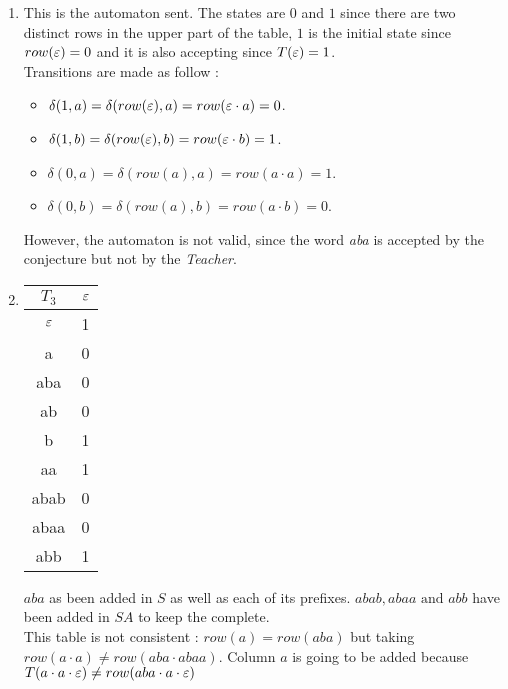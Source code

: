 \begin{enumerate}
  \item \begin{minipage}{0.3\textwidth}
          
        \end{minipage}\quad
        \begin{minipage}{0.6\textwidth}
          This is the automaton sent.
          The states are $0$ and $1$ since there are two distinct rows in the upper part of the table, $1$ is the initial state since $row(\varepsilon) = 0$ and it is also accepting since $T(\varepsilon) = 1$.\\
          Transitions are made as follow : \\
          \begin{itemize}
            \item $\delta(1, a) = \delta(row(\varepsilon), a) = row(\varepsilon \cdot a) = 0$.
            \item $\delta(1, b) = \delta(row(\varepsilon), b) = row(\varepsilon \cdot b) =  1$.
            \item $\delta(0, a) = \delta(row(a), a) = row(a \cdot a) =  1$.
            \item $\delta(0, b) = \delta(row(a), b) = row(a \cdot b) = 0$.
          \end{itemize}
          However, the automaton is not valid, since the word \textit{aba} is accepted by the conjecture but not by the \textit{Teacher}.
        \end{minipage}

  \item \begin{minipage}{0.3\textwidth}
          \begin{tabular}{c||c}
            $T_3$ & $\varepsilon$ \\
            \hline\hline
            $\varepsilon$  & 1    \\
            a     & 0    \\
            aba   & 0    \\
            ab    & 0    \\
            \hline\hline
            b     & 1    \\
            aa    & 1    \\
            abab  & 0    \\
            abaa  & 0    \\
            abb   & 1    \\
          \end{tabular}
        \end{minipage} \quad
        \begin{minipage}{0.5\textwidth}
          $aba$ as been added in $S$ as well as each of its prefixes. $abab, abaa \text{ and } abb$ have been added in $SA$ to keep the \OT complete. \\
          This table is not consistent : $row(a) = row(aba)$ but taking $row(a \cdot a) \neq row(aba \cdot abaa)$. Column $a$ is going to be added because $T(a \cdot a \cdot \varepsilon) \neq row(aba \cdot a \cdot \varepsilon)$
        \end{minipage}


\end{enumerate}
